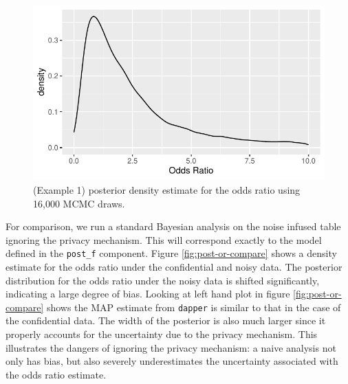 \begin{figure}

{\centering \includegraphics{dppaper_files/figure-latex/post-or-density-1} 

}

\caption{(Example 1) posterior density estimate for the odds ratio using 16,000 MCMC draws.}\label{fig:post-or-density}
\end{figure}

For comparison, we run a standard Bayesian analysis on the
noise infused table ignoring the privacy mechanism. This will
correspond exactly to the model defined in the \texttt{post\_f} component.
Figure \ref{fig:post-or-compare} shows a density estimate for the odds ratio
under the confidential and noisy data. The posterior
distribution for the odds ratio under the noisy data
is shifted significantly, indicating a large degree of bias.
Looking at left hand plot in figure \ref{fig:post-or-compare} shows the MAP estimate from \texttt{dapper}
is similar to that in the case of the confidential data.
The width of the posterior is also much larger since
it properly accounts for the uncertainty due to the privacy mechanism. This
illustrates the dangers of ignoring the privacy mechanism: a naive
analysis not only has bias, but also severely underestimates the
uncertainty associated with the odds ratio estimate.

